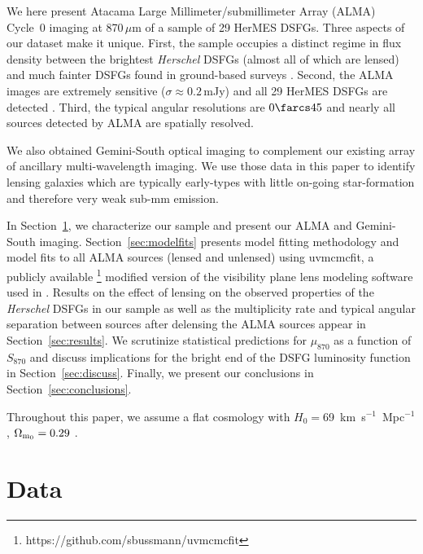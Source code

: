 \documentclass[iop]{emulateapj}
\begin{document}
We here present Atacama Large Millimeter/submillimeter Array (ALMA) Cycle~0
imaging at 870$\,\mu$m of a sample of 29 HerMES DSFGs.
Three aspects of our dataset make it unique.  First, the sample occupies a
distinct regime in flux density between the brightest {\it Herschel} DSFGs
(almost all of which are lensed) and much fainter DSFGs found in ground-based
surveys \citep[most of which are expected to be unlensed;
e.g.,][]{Hodge:2013qy}.  Second, the ALMA images are extremely sensitive
($\sigma \approx 0.2\,$mJy) and all 29 HerMES DSFGs are detected \citep[such is
not the case in previous similar studies with shallower imaging;
e.g.,][]{Smolcic:2012zl, Barger:2012yg, Hodge:2013qy}.  Third, the typical
angular resolutions are $0\farcs45$ and nearly all sources detected by ALMA are
spatially resolved.

We also obtained Gemini-South optical imaging to complement our existing array
of ancillary multi-wavelength imaging.  We use those data in this paper to
identify lensing galaxies which are typically early-types with little on-going
star-formation and therefore very weak sub-mm emission.

In Section~\ref{sec:obs}, we characterize our sample and present our ALMA and
Gemini-South imaging.  Section~\ref{sec:modelfits} presents model fitting
methodology and model fits to all ALMA sources (lensed and unlensed) using {\sc
uvmcmcfit}, a publicly available
\footnote{https://github.com/sbussmann/uvmcmcfit} modified version of the
visibility plane lens modeling software used in \citet{Bussmann:2012lr,
Bussmann:2013lr}.  Results on the effect of lensing on the observed properties
of the {\it Herschel} DSFGs in our sample as well as the multiplicity rate and
typical angular separation between sources after delensing the ALMA sources
appear in Section~\ref{sec:results}.  We scrutinize statistical predictions for
$\mu_{870}$ as a function of $S_{870}$ and discuss implications for the bright
end of the DSFG luminosity function in Section~\ref{sec:discuss}.  Finally, we
present our conclusions in Section~\ref{sec:conclusions}.

Throughout this paper, we assume a flat cosmology with
$H_0=$69~km~s$^{-1}$~Mpc$^{-1}$, $\Omega_{\rm m_0} = 0.29$
\citep{Hinshaw:2013ty}.

\section{Data}\label{sec:obs}
\end{document}
